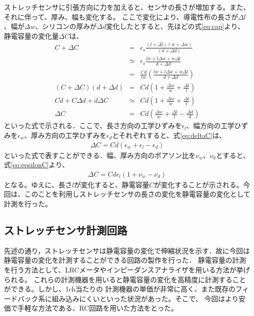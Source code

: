 ストレッチセンサに引張方向に力を加えると、センサの長さが増加する。また、それに伴って、厚み、幅も変化する。
ここで変化により、導電性布の長さが$\Delta{l}$、幅が$\Delta{w}$、シリコンの厚みが$\Delta{d}$変化したとすると、先ほどの式\ref{eq:cap}より、静電容量の変化量$\Delta{C}$は、
\begin{eqnarray}
    C+\Delta{C} &=& \epsilon{}_s\frac{(l+\Delta{l})(w+\Delta{w})}{(d+\Delta{}d)}\\
    & \simeq & \epsilon{}_s\frac{lw+l\Delta{w}+w\Delta{l}}{d+\Delta{d}}\\
    &=&\frac{Cd}{lw}\left(\frac{lw+l\Delta{w}+w\Delta{l}}{d+\Delta{d}}\right)\\
    (C+\Delta{C})(d+\Delta{d})&=&Cd\left(1+\frac{\Delta{w}}{w}+\frac{\Delta{l}}{l}\right)\\
    Cd+C\Delta{d}+d\Delta{C}& \simeq &Cd\left(1+\frac{\Delta{w}}{w}+\frac{\Delta{l}}{l}\right)\\
    \Delta{C}&=&Cd\left(\frac{\Delta{w}}{w}+\frac{\Delta{l}}{l}-\frac{\Delta{d}}{d}\right)
    \label{eq:deltaC}
\end{eqnarray}
といった式で示される．ここで、長さ方向の工学ひずみを$\epsilon_l$、幅方向の工学ひずみを$\epsilon_w$、厚み方向の工学ひずみを$\epsilon_d$とそれぞれすると、式\ref{eq:deltaC}は、
\begin{eqnarray}
    \Delta{C}=Cd(\epsilon_w+\epsilon_l-\epsilon_d)
    \label{eq:epsilonC}
\end{eqnarray}
といった式で表すことができる．幅、厚み方向のポアソン比を$\nu_w$、$\nu_d$とすると、式\ref{eq:epsilonC}より、
\begin{eqnarray}
    \Delta{C}=Cd\epsilon_l(1+\nu_w-\nu_d)
\end{eqnarray}
となる。ゆえに、長さ$l$が変化すると、静電容量$C$が変化することが示される。今回は、このことを利用しストレッチセンサの長さの変化を静電容量の変化として計測を行った。

\subsection{ストレッチセンサ計測回路}\label{sec:RC回路}
先述の通り，ストレッチセンサは静電容量の変化で伸縮状況を示す．故に今回は静電容量の変化を計測することができる回路の製作を行った．
静電容量の計測を行う方法として、LRCメータやインピーダンスアナライザを用いる方法が挙げられる。
これらの計測機器を用いると静電容量の変化を高精度に計測することができる。しかし、1ch当たりの
計測機器の単価が非常に高く、また既存のフィードバック系に組み込みにくいといった状況があった。そこで、
今回はより安価で手軽な方法である、RC回路を用いた方法をとった。

